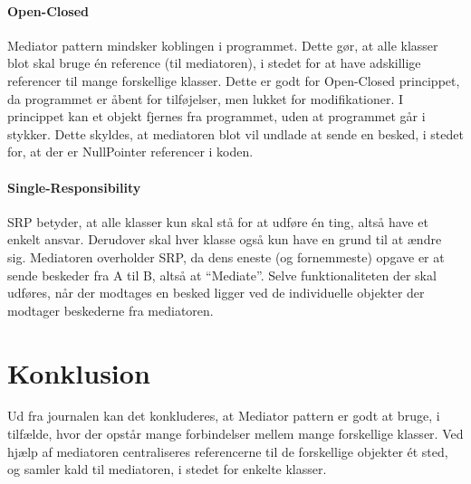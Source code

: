 \paragraph{Open-Closed}
Mediator pattern mindsker koblingen i programmet. Dette gør, at alle klasser blot skal bruge én reference (til mediatoren), i stedet for at have adskillige referencer til mange forskellige klasser. Dette er godt for Open-Closed princippet, da programmet er åbent for tilføjelser, men lukket for modifikationer. I princippet kan et objekt fjernes fra programmet, uden at programmet går i stykker. Dette skyldes, at mediatoren blot vil undlade at sende en besked, i stedet for, at der er NullPointer referencer i koden.

\paragraph{Single-Responsibility}
SRP betyder, at alle klasser kun skal stå for at udføre én ting, altså have et enkelt ansvar. Derudover skal hver klasse også kun have en grund til at ændre sig. Mediatoren overholder SRP, da dens eneste (og fornemmeste) opgave er at sende beskeder fra A til B, altså at “Mediate”. Selve funktionaliteten der skal udføres, når der modtages en besked ligger ved de individuelle objekter der modtager beskederne fra mediatoren.

\section{Konklusion}
Ud fra journalen kan det konkluderes, at Mediator pattern er godt at bruge, i tilfælde, hvor der opstår mange forbindelser mellem mange forskellige klasser. Ved hjælp af mediatoren centraliseres referencerne til de forskellige objekter ét sted, og samler kald til mediatoren, i stedet for enkelte klasser.